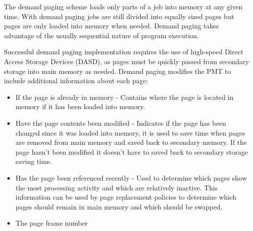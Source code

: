 \documentclass[12pt letter]{report}
\begin{document}




The demand paging scheme loads only parts of a job into memory at any given time. With demand paging jobs are still divided into equally sized pages but pages are only loaded into memory when needed. Demand paging takes advantage of the usually sequential nature of program execution.

Successful demand paging implementation requires the use of high-speed Direct Access Storage Devices (DASD), as pages must be quickly passed from secondary storage into main memory as needed. Demand paging modifies the PMT to include additional information about each page:
\begin{itemize}
  \item If the page is already in memory - Contains where the page is located in memory if it has been loaded into memory.
  \item Have the page contents been modified -  Indicates if the page has been changed since it was loaded into memory, it is used to save time when pages are removed from main memory and saved back to secondary memory. If the page hasn't been modified it doesn't have to saved back to secondary storage saving time.
  \item Has the page been referenced recently - Used to determine which pages show the most processing activity and which are relatively inactive. This information can be used by page replacement policies to determine which pages should remain in main memory and which should be swapped.
  \item The page frame number
\end{itemize}
\end{document}
